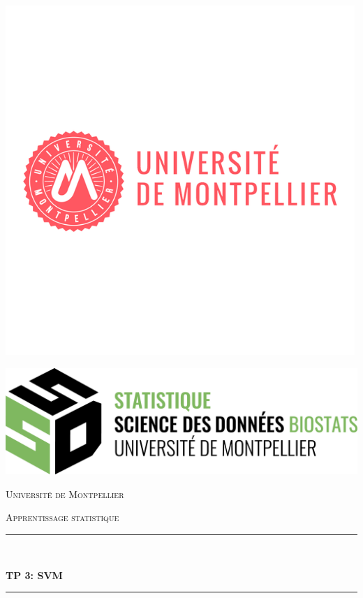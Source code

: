 \documentclass[
  12pt,
  letterpaper,
  DIV=11,
  numbers=noendperiod]{scrartcl}
\author{}
\date{Invalid Date}
\begin{document}
\begin{titlepage}
\centering

\begin{minipage}[c]{6cm}
    \centering
    \includegraphics[width=\linewidth]{Logo.png}
\end{minipage}
\hspace{1cm}
\begin{minipage}[c]{6cm}
    \centering
    \includegraphics[width=\linewidth]{ssd_logo_couleur_noir_variante_biostats.png}
\end{minipage}

\vspace{0.5cm}

{\scshape\LARGE Université de Montpellier \par}
\vspace{1cm}
{\scshape\Large Apprentissage statistique \par}
\vspace{0.5cm}
\rule{\linewidth}{0.5 mm} \\[0.4 cm]
{\huge\bfseries  TP 3: SVM \par}
\rule{\linewidth}{0.5 mm} \\[1.5 cm]


\end{titlepage}
\end{document}
